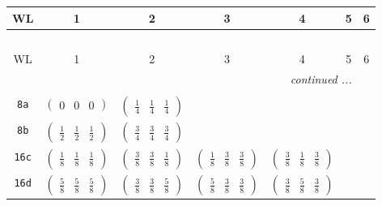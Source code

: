 \documentclass[fleqn,9pt,landscape]{jsarticle}
\begin{document}
\begin{center}
\renewcommand{\arraystretch}{1.2}
\begin{longtable}{ccccccc}
 \hline \hline
WL & 1 & 2 & 3 & 4 & 5 & 6 \\ \hline \endfirsthead

\multicolumn{6}{l}{\tablename\ \thetable{}} \\
 \hline \hline
WL & 1 & 2 & 3 & 4 & 5 & 6 \\ \hline \endhead

 \hline \hline
\multicolumn{6}{r}{\footnotesize\it continued ...} \\ \endfoot

 \hline \hline
\multicolumn{6}{r}{} \\ \endlastfoot

{\tt 8a} & $ \begin{pmatrix} 0 & 0 & 0 \end{pmatrix} $ & $ \begin{pmatrix} \frac{1}{4} & \frac{1}{4} & \frac{1}{4} \end{pmatrix} $ & $  $ & $  $ & $  $ & $  $ \\ \hline
{\tt 8b} & $ \begin{pmatrix} \frac{1}{2} & \frac{1}{2} & \frac{1}{2} \end{pmatrix} $ & $ \begin{pmatrix} \frac{3}{4} & \frac{3}{4} & \frac{3}{4} \end{pmatrix} $ & $  $ & $  $ & $  $ & $  $ \\ \hline
{\tt 16c} & $ \begin{pmatrix} \frac{1}{8} & \frac{1}{8} & \frac{1}{8} \end{pmatrix} $ & $ \begin{pmatrix} \frac{3}{8} & \frac{3}{8} & \frac{1}{8} \end{pmatrix} $ & $ \begin{pmatrix} \frac{1}{8} & \frac{3}{8} & \frac{3}{8} \end{pmatrix} $ & $ \begin{pmatrix} \frac{3}{8} & \frac{1}{8} & \frac{3}{8} \end{pmatrix} $ & $  $ & $  $ \\ \hline
{\tt 16d} & $ \begin{pmatrix} \frac{5}{8} & \frac{5}{8} & \frac{5}{8} \end{pmatrix} $ & $ \begin{pmatrix} \frac{3}{8} & \frac{3}{8} & \frac{5}{8} \end{pmatrix} $ & $ \begin{pmatrix} \frac{5}{8} & \frac{3}{8} & \frac{3}{8} \end{pmatrix} $ & $ \begin{pmatrix} \frac{3}{8} & \frac{5}{8} & \frac{3}{8} \end{pmatrix} $ & $  $ & $  $ \\ \hline

\end{longtable}
\end{center}
\end{document}
